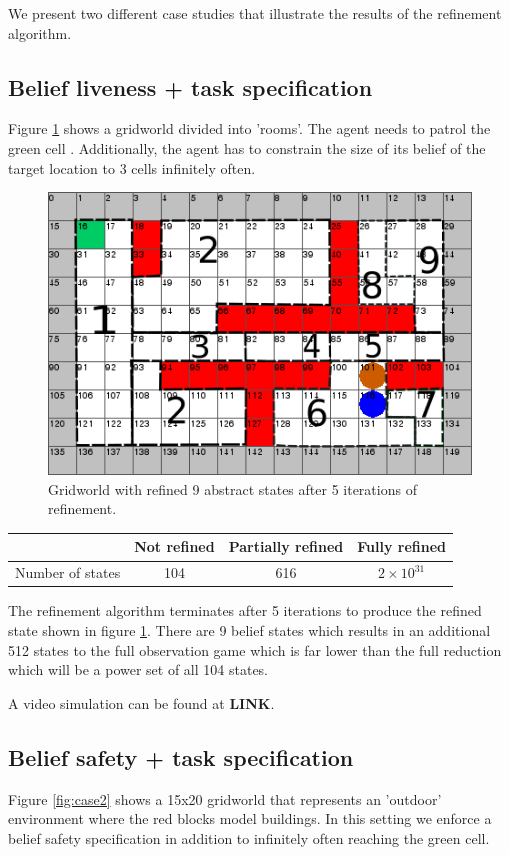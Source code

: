 We present two different case studies that illustrate the results of the refinement algorithm. 

\subsection{Belief liveness + task specification}
Figure \ref{fig:case1} shows a gridworld divided into 'rooms'. The agent needs to patrol the green cell . Additionally, the agent has to constrain the size of its belief of the target location to 3 cells infinitely often. 

\begin{figure}
\centering
\includegraphics[scale=0.5]{text970.png}\caption{Gridworld with refined 9 abstract states after 5 iterations of refinement.}\label{fig:case1}
\end{figure}

\begin{table}[h!]
\begin{tabular}{c|c|c|c}
& Not refined & Partially refined & Fully refined \\ \hline \hline
Number of states & 104 & 616 & $2\times10^{31}$
\end{tabular}
\end{table}
The refinement algorithm terminates after 5 iterations to produce the refined state shown in figure \ref{fig:case1}. There are 9 belief states which results in an additional 512 states to the full observation game which is far lower than the full reduction which will be a power set of all 104 states.  

 A video simulation can be found at \textbf{LINK}. 

\subsection{Belief safety + task specification}
Figure \ref{fig:case2} shows a 15x20 gridworld that represents an 'outdoor' environment where the red blocks model buildings. In this setting we enforce a belief safety specification in addition to infinitely often reaching the green cell. 